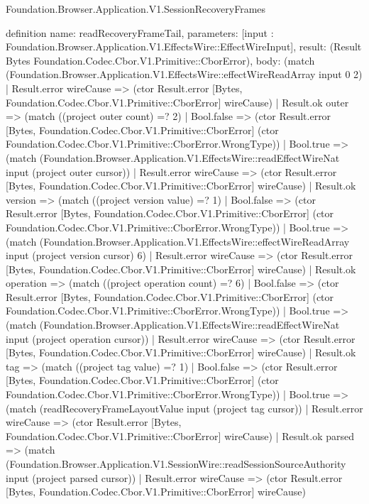 \begin{lexlean}{Foundation.Browser.Application.V1.SessionRecoveryFrames}
\begin{semanticmodule}
definition{
  name: readRecoveryFrameTail,
  parameters: [input : Foundation.Browser.Application.V1.EffectsWire::EffectWireInput],
  result: (Result Bytes Foundation.Codec.Cbor.V1.Primitive::CborError),
  body: (match (Foundation.Browser.Application.V1.EffectsWire::effectWireReadArray input 0 2)
    | Result.error wireCause => (ctor Result.error [Bytes, Foundation.Codec.Cbor.V1.Primitive::CborError] wireCause)
    | Result.ok outer => (match ((project outer count) =? 2)
      | Bool.false => (ctor Result.error [Bytes, Foundation.Codec.Cbor.V1.Primitive::CborError] (ctor Foundation.Codec.Cbor.V1.Primitive::CborError.WrongType))
      | Bool.true => (match (Foundation.Browser.Application.V1.EffectsWire::readEffectWireNat input (project outer cursor))
        | Result.error wireCause => (ctor Result.error [Bytes, Foundation.Codec.Cbor.V1.Primitive::CborError] wireCause)
        | Result.ok version => (match ((project version value) =? 1)
          | Bool.false => (ctor Result.error [Bytes, Foundation.Codec.Cbor.V1.Primitive::CborError] (ctor Foundation.Codec.Cbor.V1.Primitive::CborError.WrongType))
          | Bool.true => (match (Foundation.Browser.Application.V1.EffectsWire::effectWireReadArray input (project version cursor) 6)
            | Result.error wireCause => (ctor Result.error [Bytes, Foundation.Codec.Cbor.V1.Primitive::CborError] wireCause)
            | Result.ok operation => (match ((project operation count) =? 6)
              | Bool.false => (ctor Result.error [Bytes, Foundation.Codec.Cbor.V1.Primitive::CborError] (ctor Foundation.Codec.Cbor.V1.Primitive::CborError.WrongType))
              | Bool.true => (match (Foundation.Browser.Application.V1.EffectsWire::readEffectWireNat input (project operation cursor))
                | Result.error wireCause => (ctor Result.error [Bytes, Foundation.Codec.Cbor.V1.Primitive::CborError] wireCause)
                | Result.ok tag => (match ((project tag value) =? 1)
                  | Bool.false => (ctor Result.error [Bytes, Foundation.Codec.Cbor.V1.Primitive::CborError] (ctor Foundation.Codec.Cbor.V1.Primitive::CborError.WrongType))
                  | Bool.true => (match (readRecoveryFrameLayoutValue input (project tag cursor))
                    | Result.error wireCause => (ctor Result.error [Bytes, Foundation.Codec.Cbor.V1.Primitive::CborError] wireCause)
                    | Result.ok parsed => (match (Foundation.Browser.Application.V1.SessionWire::readSessionSourceAuthority input (project parsed cursor))
                      | Result.error wireCause => (ctor Result.error [Bytes, Foundation.Codec.Cbor.V1.Primitive::CborError] wireCause)
}
\end{semanticmodule}
\end{lexlean}

